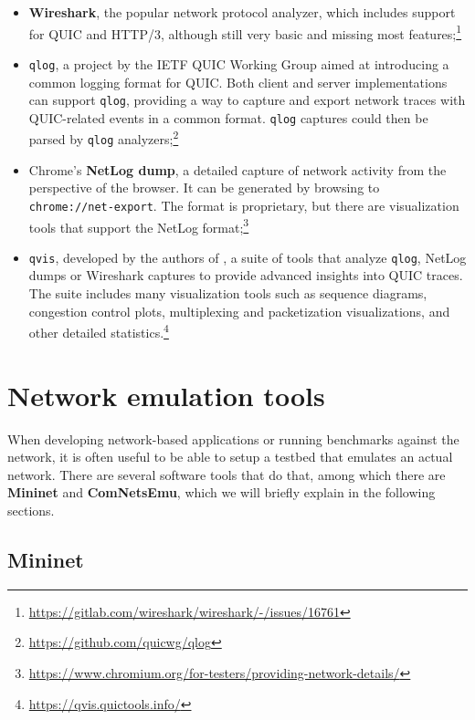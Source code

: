 \begin{itemize}
    \item \textbf{Wireshark}, the popular network protocol analyzer, which includes support for QUIC and HTTP/3, although still very basic and missing most features;\footnote{\url{https://gitlab.com/wireshark/wireshark/-/issues/16761}}
    \item \texttt{qlog}, a project by the IETF QUIC Working Group aimed at introducing a common logging format for QUIC. Both client and server implementations can support \texttt{qlog}, providing a way to capture and export network traces with QUIC-related events in a common format. \texttt{qlog} captures could then be parsed by \texttt{qlog} analyzers;\footnote{\url{https://github.com/quicwg/qlog}}
    \item Chrome's \textbf{NetLog dump}, a detailed capture of network activity from the perspective of the browser. It can be generated by browsing to \texttt{chrome://net-export}. The format is proprietary, but there are visualization tools that support the NetLog format;\footnote{\url{https://www.chromium.org/for-testers/providing-network-details/}}
    \item \texttt{qvis}, developed by the authors of \cite{quicdiversity}, a suite of tools that analyze \texttt{qlog}, NetLog dumps or Wireshark captures to provide advanced insights into QUIC traces. The suite includes many visualization tools such as sequence diagrams, congestion control plots, multiplexing and packetization visualizations, and other detailed statistics.\footnote{\url{https://qvis.quictools.info/}}
\end{itemize}

\section{Network emulation tools}
\label{sec:bg/network}

When developing network-based applications or running benchmarks against the network, it is often useful to be able to setup a testbed that emulates an actual network. There are several software tools that do that, among which there are \textbf{Mininet} and \textbf{ComNetsEmu}, which we will briefly explain in the following sections.

\subsection{Mininet}
\label{sec:bg/network/mininet}

